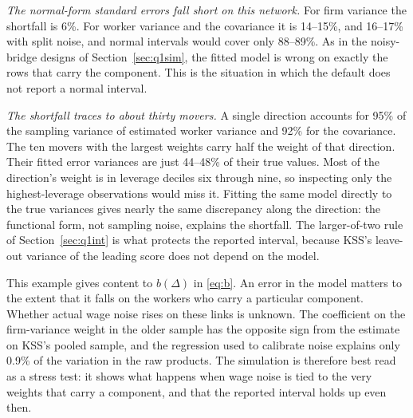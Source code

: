 \emph{The normal-form standard errors fall short on this network.} For firm variance
the shortfall is 6\%. For worker variance and the covariance it is 14--15\%, and
16--17\% with split noise, and normal intervals would cover only 88--89\%. As in the
noisy-bridge designs of Section~\ref{sec:q1sim}, the fitted model is wrong on exactly
the rows that carry the component. This is the situation in which the default does not
report a normal interval.

\emph{The shortfall traces to about thirty movers.} A single direction accounts for
95\% of the sampling variance of estimated worker variance and 92\% for the
covariance. The ten movers with the largest weights carry half the weight of that
direction. Their fitted error variances are just 44--48\% of their true values. Most
of the direction's weight is in leverage deciles six through nine, so inspecting only
the highest-leverage observations would miss it. Fitting the same model directly to
the true variances gives nearly the same discrepancy along the direction: the
functional form, not sampling noise, explains the shortfall. The larger-of-two rule of
Section~\ref{sec:q1int} is what protects the reported interval, because KSS's
leave-out variance of the leading score does not depend on the model.

This example gives content to $b(\Delta)$ in \eqref{eq:b}. An error in the
model matters to the extent that it falls on the workers who carry a
particular component. Whether actual wage noise rises on these links is
unknown. The coefficient on the firm-variance weight in the older sample
has the opposite sign from the estimate on KSS's pooled sample, and the
regression used to calibrate noise explains only 0.9\% of the variation
in the raw products. The simulation is therefore best read as a stress test: it shows
what happens when wage noise is tied to the very weights that carry a component, and
that the reported interval holds up even then.

